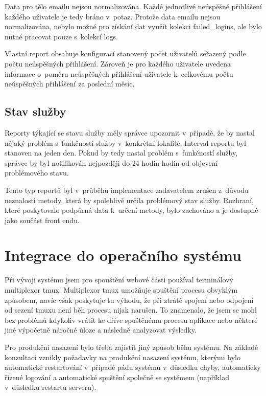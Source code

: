 \documentclass[thesis=M,czech]{FITthesis}[2012/06/26]
\begin{document}
      Data pro tělo emailu nejsou normalizována.
      Každé jednotlivé neúspěšné přihlášení každého uživatele je tedy bráno v~potaz.
      Protože data emailu nejsou normalizována, 
      nebylo možné pro získání dat využít kolekci failed\_logins, 
      ale bylo nutné pracovat pouze s~kolekcí logs.

      Vlastní report obsahuje konfigurací stanovený počet uživatelů seřazený podle počtu
      neúspěšných přihlášení. 
      Zároveň je pro každého uživatele uvedena informace o~poměru neúspěšných přihlášení uživatele 
      k~celkovému počtu neúspěšných přihlášení za poslední měsíc.

    \subsection{Stav služby}

      Reporty týkající se stavu služby měly správce upozornit
      v~případě, že by nastal nějaký problém s~funkčností služby v~konkrétní lokalitě.
      Interval reportu byl stanoven na jeden den.
      Pokud by tedy nastal problém s~funkčností služby, 
      správce by byl notifikován nejpozději do 24 hodin hodin od objevení problémového stavu.

      Tento typ reportů byl v~průběhu implementace zadavatelem zrušen z~důvodu neznalosti
      metody, která by spolehlivě určila problémový stav služby.
      Rozhraní, které poskytovalo podpůrná data k~určení metody, bylo zachováno
      a je dostupné jako součást front endu.

  \section{Integrace do operačního systému}

    Při vývoji systému jsem pro spouštění webové části používal terminálový multiplexor tmux.
    Multiplexor tmux umožňuje spuštění procesu obvyklým způsobem,
    navíc však poskytuje tu výhodu, 
    že při ztrátě spojení nebo odpojení od sezení tmuxu
    není běh procesu nijak narušen.
    To znamenalo, že jsem se mohl bez problémů kdykoliv
    vrátit ke dříve spuštěnému procesu aplikace nebo některé
    jiné výpočetně náročné úloze a následně analyzovat výsledky.

    Pro produkční nasazení bylo třeba zajistit jiný způsob běhu systému.
    Na základě konzultací vznikly požadavky na produkční nasazení systému,
    kterými bylo automatické restartování v~případě pádu systému v~důsledku chyby,
    automaticky řízené logování a automatické spuštění společně se systémem (například v~důsledku restartu serveru).
\end{document}
